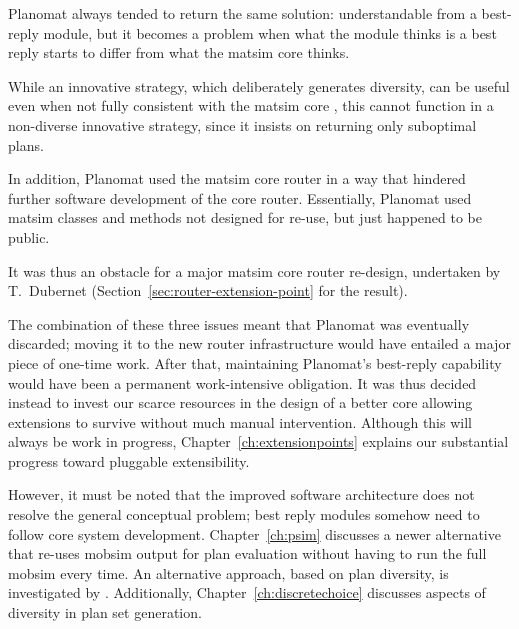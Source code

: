 \begin{compactitem}
\item Planomat always tended to return the same solution: understandable from a best-reply module, but it becomes a problem when what the module thinks is a best reply starts to differ from what the \gls{matsim} core thinks.  

While an innovative strategy, which deliberately generates diversity, can be useful even when not fully consistent with the \gls{matsim} core \citep{NagelKickhoeferJoubert2014HeterogeneousVoTsPROCEDIA}, this cannot function in a non-diverse innovative strategy, since it insists on returning only suboptimal plans.

\item In addition, Planomat used the \gls{matsim} core router in a way that hindered further software development of the core router. Essentially, Planomat used \gls{matsim} classes and methods not designed for re-use, but just happened to be public.

It was thus an obstacle for a major \gls{matsim} core router re-design, undertaken by T.~Dubernet (Section~\ref{sec:router-extension-point} for the result).

\end{compactitem}

The combination of these three issues meant that Planomat was eventually discarded; moving it to the new router infrastructure would have entailed a major piece of one-time work. After that, maintaining Planomat's best-reply capability would have been a permanent work-intensive obligation. It was thus decided instead to invest our scarce resources in the design of a better core allowing extensions to survive without much manual intervention. Although this will always be work in progress, Chapter~\ref{ch:extensionpoints} explains our substantial progress toward pluggable extensibility.

However, it must be noted that the improved software architecture does not resolve the general conceptual problem; best reply modules somehow need to follow core system development. Chapter~\ref{ch:psim} discusses a newer alternative that re-uses \gls{mobsim} output for plan evaluation without having to run the full \gls{mobsim} every time. An alternative approach, based on plan diversity, is investigated by \cite{NagelKickhoeferJoubert2014HeterogeneousVoTsPROCEDIA}. Additionally, Chapter~\ref{ch:discretechoice} discusses aspects of diversity in plan set generation.


